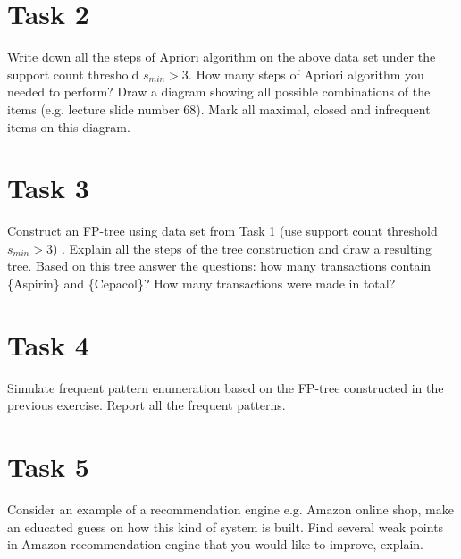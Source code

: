 \documentclass{article}
\begin{document}
\section*{Task 2}
Write down all the steps of Apriori algorithm on the above data set under the support count  threshold $s_{min} > 3$. How many steps of Apriori algorithm you needed to perform? Draw a diagram showing all possible combinations of the items (e.g. lecture slide number 68). Mark all maximal, closed and infrequent items on this diagram.

\section*{Task 3}
Construct an FP-tree using data set from Task 1 (use support count  threshold $s_{min} > 3$) . Explain all the steps of the tree construction and draw a resulting tree. Based on this tree answer the questions: how many transactions contain \{Aspirin\} and \{Cepacol\}? How many transactions were made in total?

\section*{Task 4}
Simulate frequent pattern enumeration based on the FP-tree constructed in the previous exercise. Report all the frequent patterns. 

\section*{Task 5}
Consider an example of a recommendation engine e.g. Amazon online shop, make an educated guess on how this kind of system is built. Find several weak points in Amazon recommendation engine that you would like to improve, explain.
\end{document}
